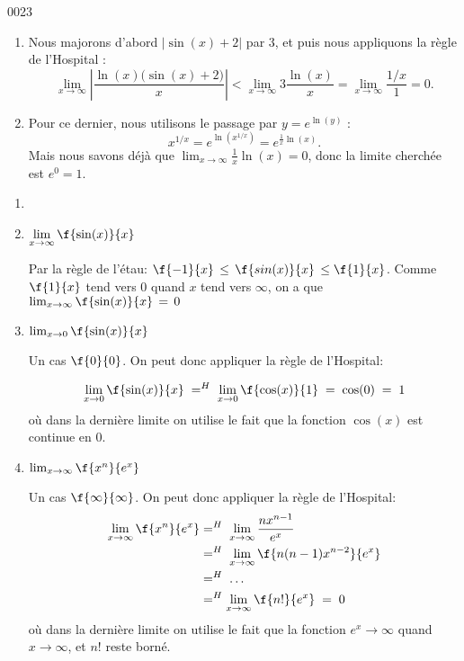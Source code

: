 \begin{corrige}{0023}
\begin{enumerate}
\item
Nous majorons d'abord $|\sin(x)+2|$ par $3$, et puis nous appliquons la règle de l'Hospital :
\begin{equation}
	\lim_{x\to\infty}\left| \frac{ \ln(x)\big( \sin(x)+2 \big) }{ x } \right|<\lim_{x\to\infty}3\frac{ \ln(x) }{ x }=\lim_{x\to\infty}\frac{ 1/x }{ 1 }=0.
\end{equation}

\item
Pour ce dernier, nous utilisons le passage par $y= e^{\ln(y)}$ :
\begin{equation}
	x^{1/x}= e^{\ln(x^{1/x})}= e^{\frac{1}{ x }\ln(x)}.
\end{equation}
Mais nous savons déjà que $\lim_{x\to\infty}\frac{1}{ x }\ln(x)=0$, donc la limite cherchée est $ e^{0}=1$.

\end{enumerate}

\begin{alternative}

	\begin{enumerate}

		\item

		\item $\displaystyle{ \lim_{x\rightarrow \infty}\f{\sin(x)}{x}}$\hs

		Par la règle de l'étau: $ \f{-1}{x} \, \leq\, \f{sin(x)}{x} \,\leq \f{1}{x}$. Comme $\f{1}{x}$ tend vers $0$ quand $x$ tend vers $\infty$, on a que $ \lim_{x\rightarrow\infty}\f{\sin(x)}{x} \, =\,0$

		\item $ \lim_{x\rightarrow 0}\f{\sin(x)}{x}$\hs

		Un cas $\f{0}{0}$. On peut donc appliquer la règle de l'Hospital:

		 \[\lim_{x\rightarrow 0}\f{\sin(x)}{x} \; =^{H}\; \lim_{x\rightarrow 0}\f{\cos(x)}{1}\;=\; \cos(0)\;=\;1\] o\`{u} dans la dernière limite on utilise le fait que la fonction $\cos(x)$ est continue en $0$.
		 
		 
		 \item $ \lim_{x\rightarrow \infty }\f{x^n}{e^x}$\hs
		 
		Un cas $\f{\infty}{\infty}$. On peut donc appliquer la règle de l'Hospital:
	\begin{equation}
	\begin{aligned}[]
		\lim_{x\rightarrow \infty}\f{x^n}{e^x}&=^H\;  \lim_{x\rightarrow \infty}\frac{nx^{n-1}}{e^x}\\
			&=^H\;  \lim_{x\rightarrow \infty}\f{n(n-1)x^{n-2}}{e^x}\\
			&=^H\; \ldots\\
			&=^H\lim_{x\rightarrow \infty}\f{n!}{e^x}\;=\;0
	\end{aligned}
\end{equation}	 
		 où dans la dernière limite on utilise le fait que la fonction $e^x \rightarrow  \infty$ quand $x\rightarrow  \infty$, et $n!$ reste borné.
		 

\end{enumerate}
\end{alternative}
\end{corrige}
